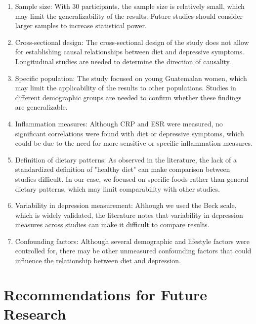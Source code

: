 \documentclass[jou]{apa7}
\begin{document}
	\begin{enumerate}
		\item Sample size: With 30 participants, the sample size is relatively small, which may limit the generalizability of the results. Future studies should consider larger samples to increase statistical power.
		\item Cross-sectional design: The cross-sectional design of the study does not allow for establishing causal relationships between diet and depressive symptoms. Longitudinal studies are needed to determine the direction of causality.
		\item Specific population: The study focused on young Guatemalan women, which may limit the applicability of the results to other populations. Studies in different demographic groups are needed to confirm whether these findings are generalizable.
		\item Inflammation measures: Although CRP and ESR were measured, no significant correlations were found with diet or depressive symptoms, which could be due to the need for more sensitive or specific inflammation measures.
		\item Definition of dietary patterns: As observed in the literature, the lack of a standardized definition of "healthy diet" can make comparison between studies difficult. In our case, we focused on specific foods rather than general dietary patterns, which may limit comparability with other studies.
		\item Variability in depression measurement: Although we used the Beck scale, which is widely validated, the literature notes that variability in depression measures across studies can make it difficult to compare results.
		\item Confounding factors: Although several demographic and lifestyle factors were controlled for, there may be other unmeasured confounding factors that could influence the relationship between diet and depression.
	\end{enumerate}

	\section{Recommendations for Future Research}\label{recomendaciones-para-futuras-investigaciones}
\end{document}
